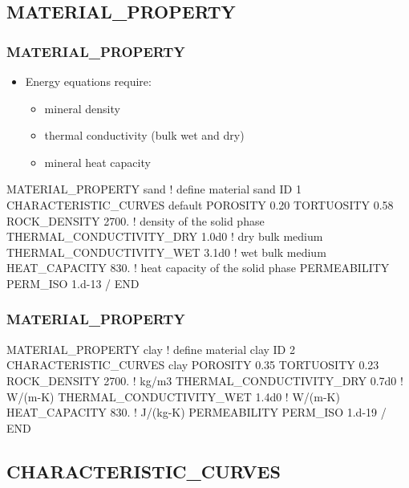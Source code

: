 \documentclass{beamer}
\newcommand\redcomment[1]{{{\color{red} #1}}}
\newcommand\bluecomment[1]{{{\color{blue} #1}}}
\newcommand\greencomment[1]{{{\color{green} #1}}}
\begin{document}
\subsection{MATERIAL\_PROPERTY}

\begin{frame}[fragile]\frametitle{MATERIAL\_PROPERTY}
\begin{itemize}
  \item Energy equations require:
  \begin{itemize}
    \item \redcomment{mineral density}
    \item \redcomment{thermal conductivity} (bulk wet and dry)
    \item \redcomment{mineral heat capacity}
  \end{itemize}
\end{itemize}

\begin{semiverbatim}
MATERIAL_PROPERTY sand \bluecomment{! define material} \greencomment{sand}
  ID 1
  CHARACTERISTIC_CURVES default
  POROSITY 0.20
  TORTUOSITY 0.58
  ROCK_DENSITY 2700. \bluecomment{! density of the solid phase}
  THERMAL_CONDUCTIVITY_DRY 1.0d0 \bluecomment{! dry bulk medium}
  THERMAL_CONDUCTIVITY_WET 3.1d0 \bluecomment{! wet bulk medium}
  HEAT_CAPACITY 830. \bluecomment{! heat capacity of the solid phase}
  PERMEABILITY
    PERM_ISO 1.d-13
  /
END
\end{semiverbatim}

\end{frame}

\begin{frame}[fragile]\frametitle{MATERIAL\_PROPERTY}

\begin{semiverbatim}
MATERIAL_PROPERTY clay \bluecomment{! define material} \greencomment{clay}
  ID 2
  CHARACTERISTIC_CURVES clay
  POROSITY 0.35
  TORTUOSITY 0.23
  ROCK_DENSITY 2700. \bluecomment{! kg/m3}
  THERMAL_CONDUCTIVITY_DRY 0.7d0 \bluecomment{! W/(m-K)}
  THERMAL_CONDUCTIVITY_WET 1.4d0 \bluecomment{! W/(m-K)}
  HEAT_CAPACITY 830. \bluecomment{! J/(kg-K)}
  PERMEABILITY
    PERM_ISO 1.d-19
  /
END
\end{semiverbatim}

\end{frame}
\subsection{CHARACTERISTIC\_CURVES}
\end{document}
